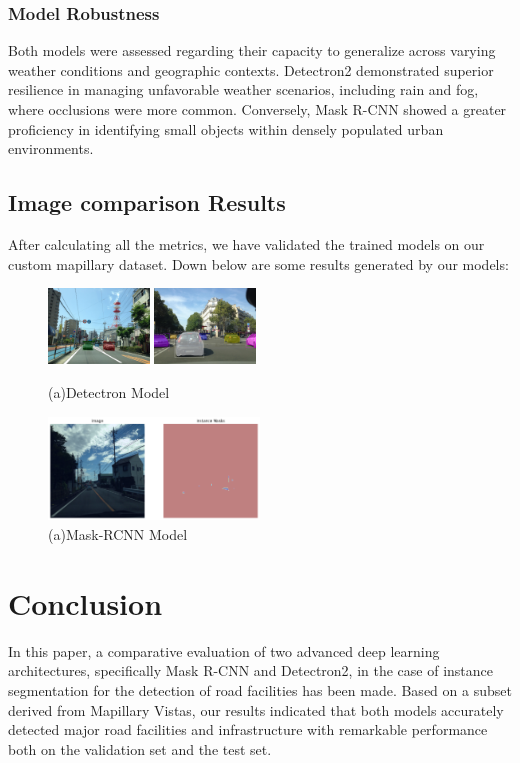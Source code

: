 \documentclass[conference]{IEEEtran}
\begin{document}
\subsubsection{Model Robustness}
Both models were assessed regarding their capacity to generalize across varying weather conditions and geographic contexts. Detectron2 demonstrated superior resilience in managing unfavorable weather scenarios, including rain and fog, where occlusions were more common. Conversely, Mask R-CNN showed a greater proficiency in identifying small objects within densely populated urban environments.

\subsection{Image comparison Results}
After calculating all the metrics, we have validated the trained models on our custom mapillary dataset. Down below are some results generated by our models:\\

\begin{figure}[htbp]
    \centering
    \includegraphics[width=0.24\textwidth]{detectres2.png} 
    \includegraphics[width=0.24\textwidth]{detectres1.png}
    \caption{(a)Detectron Model}
    \label{fig}
    \vspace{-2em}
\end{figure}
\begin{figure}[htbp]
    \centering
    \includegraphics[width=0.50\textwidth]{mask.png} 
    \caption{(a)Mask-RCNN Model}
    \label{fig}
\end{figure}
\section{Conclusion}
In this paper, a comparative evaluation of two advanced deep learning architectures, specifically Mask R-CNN and Detectron2, in the case of instance segmentation for the detection of road facilities has been made. Based on a subset derived from Mapillary Vistas, our results indicated that both models accurately detected major road facilities and infrastructure with remarkable performance both on the validation set and the test set.
\end{document}
